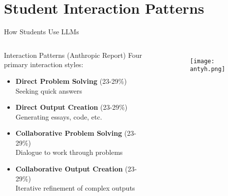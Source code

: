\documentclass{beamer}
\begin{document}
\section{Student Interaction Patterns}

\begin{frame}{How Students Use LLMs}
\begin{columns}
\begin{block}{Interaction Patterns (Anthropic Report)}
Four primary interaction styles:
\begin{itemize}
  \item \textbf{Direct Problem Solving} (23-29\%)\\
  Seeking quick answers
  \item \textbf{Direct Output Creation} (23-29\%)\\
  Generating essays, code, etc.
  \item \textbf{Collaborative Problem Solving} (23-29\%)\\
  Dialogue to work through problems
  \item \textbf{Collaborative Output Creation} (23-29\%)\\
  Iterative refinement of complex outputs
\end{itemize}
\end{block}

\alert{}
\begin{figure}
    \centering
    \texttt{[image: antyh.png]}
\end{figure}
\end{columns}
\end{frame}
\end{document}
